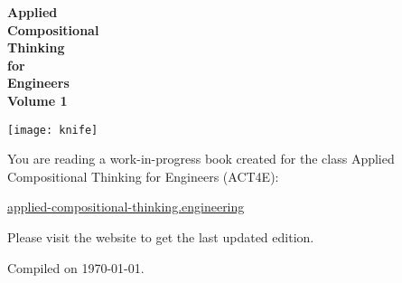 \thispagestyle{empty}
\begin{center}

  \vspace{3cm}
  {\huge\bfseries Applied\\Compositional\\Thinking \\[3mm]for\\[1mm] Engineers\\[1cm]Volume 1}


\end{center}

\vfill
\begin{center}
  \texttt{[image: knife]}
\end{center}


\vfill
\clearpage

You are reading a work-in-progress book created for the
class Applied Compositional Thinking for Engineers (ACT4E):

\href{https://applied-compositional-thinking.engineering}{applied-compositional-thinking.engineering}

Please visit the website to get the last updated edition.

Compiled on \today.
